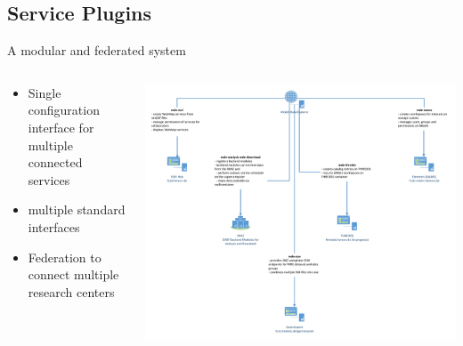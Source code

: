 \subsection*{Service Plugins}

\begin{frame}{A modular and federated system}
    \begin{columns}
        \begin{column}{0.3\textwidth}
            \begin{itemize}
                \item Single configuration interface for multiple connected
                    services
                \item multiple standard interfaces
                \item Federation to connect multiple research centers
            \end{itemize}

            \vspace{1em}

            \hyperlink{frm:service-plugins}{}
        \end{column}
        \begin{column}{0.7\textwidth}
            \includegraphics[width=\textwidth, page=2]{figures/mde-service-plugins-basic.pdf}
        \end{column}
    \end{columns}
\end{frame}